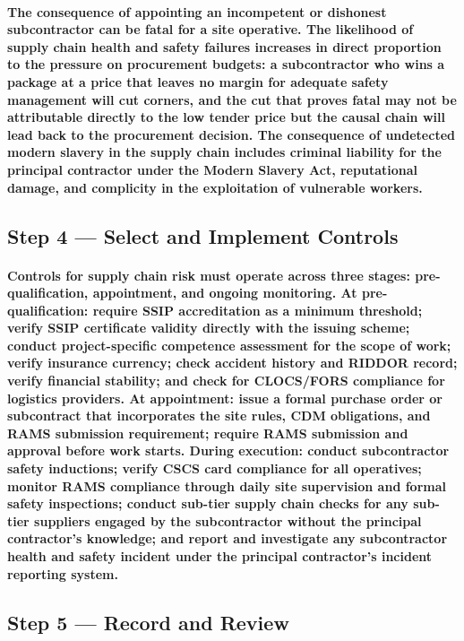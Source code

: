 \paragraph{The consequence of appointing an incompetent or dishonest subcontractor can be fatal for a site operative. The likelihood of supply chain health and safety failures increases in direct proportion to the pressure on procurement budgets: a subcontractor who wins a package at a price that leaves no margin for adequate safety management will cut corners, and the cut that proves fatal may not be attributable directly to the low tender price but the causal chain will lead back to the procurement decision. The consequence of undetected modern slavery in the supply chain includes criminal liability for the principal contractor under the Modern Slavery Act, reputational damage, and complicity in the exploitation of vulnerable workers.}

\subsection{Step 4 --- Select and Implement Controls}
\paragraph{Controls for supply chain risk must operate across three stages: pre-qualification, appointment, and ongoing monitoring. At pre-qualification: require SSIP accreditation as a minimum threshold; verify SSIP certificate validity directly with the issuing scheme; conduct project-specific competence assessment for the scope of work; verify insurance currency; check accident history and RIDDOR record; verify financial stability; and check for CLOCS/FORS compliance for logistics providers. At appointment: issue a formal purchase order or subcontract that incorporates the site rules, CDM obligations, and RAMS submission requirement; require RAMS submission and approval before work starts. During execution: conduct subcontractor safety inductions; verify CSCS card compliance for all operatives; monitor RAMS compliance through daily site supervision and formal safety inspections; conduct sub-tier supply chain checks for any sub-tier suppliers engaged by the subcontractor without the principal contractor's knowledge; and report and investigate any subcontractor health and safety incident under the principal contractor's incident reporting system.}

\subsection{Step 5 --- Record and Review}
